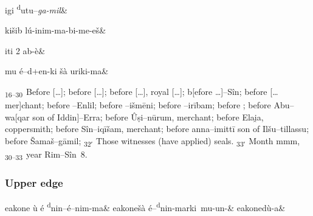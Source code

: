 \documentclass{memoir}
\begin{document}
\begin{pairs}
\begin{Leftside}
  \begin{astanza}
    igi \textsuperscript{d}utu--\emph{ga-mil}\&
  \end{astanza}
  \begin{astanza}
    kišib lú-inim-ma-bi-me-eš\&
  \end{astanza}
  \begin{astanza}
    iti 2 ab-è\&
  \end{astanza}
  \begin{astanza}
    mu é--d+en-ki šà uriki-ma\&
  \end{astanza}
  \pausenumbering
\end{Leftside}
\begin{Rightside}
  \resumenumbering
  \autopar
  \noindent\textsubscript{16--30~}Before [\dots];\pend
  \noindent before [\dots];\pend
  \noindent before [\dots], royal [\dots];\pend
  \noindent b[efore \dots ]{\sffamily --Sîn};\pend
  \noindent before [\dots  mer]chant;\pend
  \noindent before {\sffamily [\dots]--Enlil};\pend
  \noindent before {\sffamily [\dots]--išmēni};\pend
  \noindent before {\sffamily [\dots]--irībam};\pend
  \noindent before {\sffamily [\dots]};\pend
  \noindent before {\sffamily Abu--wa[qar} son of {\sffamily Iddin]--Erra};\pend
  \noindent before {\sffamily Ûṣi--nūrum}, merchant;\pend
  \noindent before {\sffamily Elai̯a}, coppersmith;\pend
  \noindent before {\sffamily Sîn--iqīšam}, merchant;\pend
  \noindent before anna{\sffamily --imittī} son of {\sffamily Ilšu--tillassu};\pend
  \noindent before {\sffamily Šamaš--gāmil};\pend
  \noindent\textsubscript{32′~}Those witnesses (have applied) seals.\pend
  \noindent\textsubscript{33′~}Month mmm,\pend
  \noindent\textsubscript{30--33~}year Rim--Sîn~8.\pend
  \pausenumbering
\end{Rightside}
\end{pairs}
\Columns
{}\leavevmode

\subsubsection{Upper edge}
\begin{pairs}
  \OnehalfSpacing
  \begin{Leftside}
    \resumenumbering
    \begin{astanza}
      eakone ù  é \textsuperscript{d}nin--é--nim-ma&
      eakonešà é--\textsuperscript{d}nin-marki\ mu-un-&
      \quad eakonedù-a\&
    \end{astanza}
  \endnumbering
\end{Leftside}
\begin{Rightside}
  \resumenumbering
  \autopar
  \noindent{}\pend
\endnumbering
\end{Rightside}
\end{pairs}
\Columns
{}\leavevmode
\end{document}
